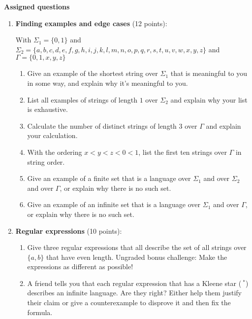 {\bf Assigned questions}
\begin{enumerate}[wide, labelwidth=!, labelindent=0pt]
\item\gradeCompleteFirst \textbf{Finding examples and edge cases} (12 points):

With $\Sigma_1 = \{0,1\}$ and 
$\Sigma_2 = \{a,b,c,d,e,f,g,h,i,j,k,l,m,n,o,p,q,r,s,t,u,v,w,x,y,z\}$
and $\Gamma = \{0,1,x,y,z\}$

    \begin{enumerate}
    \item Give an example of the shortest string over $\Sigma_1$ that is meaningful to you in some way, and explain 
    why it's meaningful to you.

    \item List all examples of strings of length $1$ over $\Sigma_2$ and explain why your list is exhaustive.

    \item Calculate the number of distinct strings of length 3 over $\Gamma$ and explain your calculation.

    \item With the ordering $x < y < z < 0 < 1$, list the first ten strings over $\Gamma$ in string order.

    \item Give an example of a finite set that is a language over $\Sigma_1$ and over $\Sigma_2$ and over $\Gamma$, 
    or explain why there is no such set.
    
    \item  Give an example of an infinite set that is a language over $\Sigma_1$  and over $\Gamma$, 
    or explain why there is no such set.

    \end{enumerate}

\item\gradeComplete \textbf{Regular expressions} (10 points):

    \begin{enumerate}
    \item Give three regular expressions that all describe the set of all strings over $\{a,b\}$ that have 
    even length. Ungraded bonus challenge: Make the expressions as different as possible!

    \item A friend tells you that each regular expression that has a Kleene star ($~^*$) describes an
    infinite language. Are they right? Either help them justify their claim or give a counterexample to disprove it
    and then fix the formula.


\end{enumerate}
\end{enumerate}
